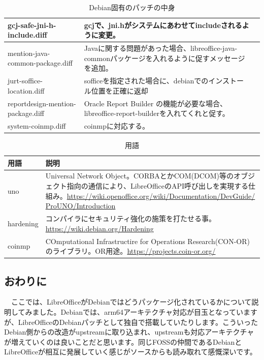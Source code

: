 \documentclass[mingoth,a4paper]{jsarticle}
\begin{document}
\begin{table}[ht!]
\begin{center}
{{\begin{tabular}{|l|p{7cm}|p{3cm}|}
gcj-safe-jni-h-include.diff & gcjで、jni.hがシステムにあわせてincludeされるように変更。& \\ \hline
mention-java-common-package.diff & Javaに関する問題があった場合、libreoffice-java-commonパッケージを入れるように促すメッセージを追加。& \\ \hline
jurt-soffice-location.diff & sofficeを指定された場合に、debianでのインストール位置を正確に返却 & \\ \hline
reportdesign-mention-package.diff & Oracle Report Builder の機能が必要な場合、libreoffice-report-builderを入れてくれと促す。& \\ \hline
system-coinmp.diff & coinmpに対応する。 & \\ \hline
\end{tabular}
}}
\end{center}
\caption{Debian固有のパッチの中身}
\label{tab:debian-specific-libreoffice-patches}
\end{table}

\begin{table}[ht!]
\begin{center}
{\small{
\begin{tabular}{|l|p{10cm}|}
\hline
用語 & 説明 \\ \hline \hline
uno &  Universal Network Object。CORBAとかCOM(DCOM)等のオブジェクト指向の通信により、LibreOfficeのAPI呼び出しを実現する仕組み。\url{https://wiki.openoffice.org/wiki/Documentation/DevGuide/ ProUNO/Introduction} \\ \hline
hardening & コンパイラにセキュリティ強化の施策を打たせる事。\url{https://wiki.debian.org/Hardening} \\ \hline
coinmp & COmputational Infrastructire for Operations Research(CON-OR)のライブラリ。OR用途。\url{https://projects.coin-or.org/} \\ \hline
\end{tabular}
}}
\end{center}
\caption{用語}
\label{tab:debian-specific-libreoffice-patches-usage}
\end{table}


\subsection{おわりに}

　ここでは、LibreOfficeがDebianではどうパッケージ化されているかについて説明してみました。Debianでは、arm64アーキテクチャ対応が目玉となっていますが、LibreOfficeのDebianパッチとして独自で搭載していたりします。こういったDebian側からの改造がupstreamに取り込まれ、upstreamも対応アーキテクチャが増えていくのは良いことだと思います。同じFOSSの仲間であるDebianとLibreOfficeが相互に発展していく感じがソースからも読み取れて感慨深いです。
\end{document}
